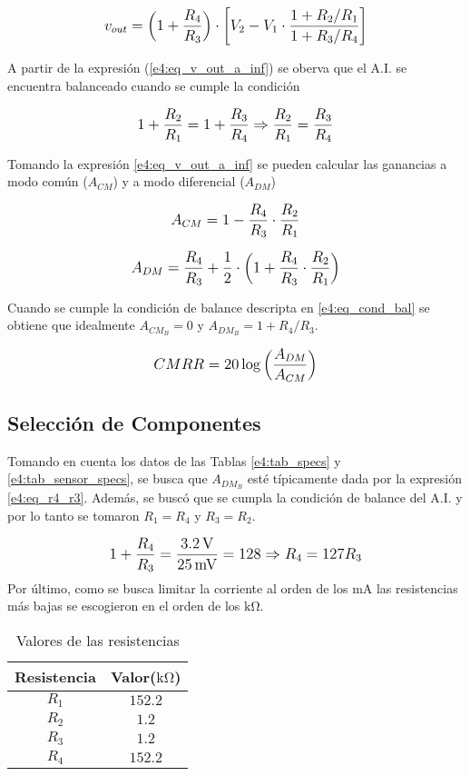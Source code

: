 \begin{equation}
\mathlarger{
v_{out} = \left(1 + \frac{R_4}{R_3}\right) \cdot \left[ V_2 - V_1 \cdot \frac{1+ R_2/R_1}{1+R_3/R_4} \right]
}
\label{e4:eq_v_out_a_inf}
\end{equation}

A partir de la expresión (\ref{e4:eq_v_out_a_inf}) se oberva que el A.I. se encuentra balanceado cuando se cumple la condición

\begin{equation}
\mathlarger{
1+\frac{R_2}{R_1} = 1+\frac{R_3}{R_4} \Rightarrow \frac{R_2}{R_1} = \frac{R_3}{R_4}
}
\label{e4:eq_cond_bal}
\end{equation}

Tomando la expresión \eqref{e4:eq_v_out_a_inf} se pueden calcular las ganancias a modo común ($A_{CM}$) y a modo diferencial ($A_{DM}$)

\begin{equation}
\mathlarger{
A_{CM} = 1 - \frac{R_4}{R_3} \cdot \frac{R_2}{R_1}
}
\label{e4:eq_A_cm}
\end{equation}

\begin{equation}
\mathlarger{
A_{DM} = \frac{R_4}{R_3} + \frac{1}{2} \cdot \left(1+ \frac{R_4}{R_3} \cdot \frac{R_2}{R_1}\right)
}
\label{e4:eq_A_dm}
\end{equation}

Cuando se cumple la condición de balance descripta en \eqref{e4:eq_cond_bal} se obtiene que idealmente $A_{CM_B} = 0$ y $A_{DM_B} = 1+R_4/R_3$.

\begin{equation}
\mathlarger{
CMRR=20\log\left(\frac{A_{DM}}{A_{CM}}\right)
}
\end{equation}

\subsection{Selección de Componentes}
Tomando en cuenta los datos de las Tablas \ref{e4:tab_specs} y \ref{e4:tab_sensor_specs}, se busca que $A_{DM_B}$ esté típicamente dada por la expresión \eqref{e4:eq_r4_r3}. Además, se buscó que se cumpla la condición de balance del A.I. y por lo tanto se tomaron $R_1=R_4$ y $R_3 = R_2$.

\begin{equation}
\mathlarger{
1+ \frac{R_4}{R_3}=\frac{\SI{3.2}{\volt}}{\SI{25}{\milli\volt}}= 128 \Rightarrow R_4=127 R_3
}
\label{e4:eq_r4_r3}
\end{equation}
 Por último, como se busca limitar la corriente al orden de los $\si{\milli\ampere}$ las resistencias más bajas se escogieron en el orden de los $\si{\kilo\ohm}$.
 
\begin{table}[ht]
\begin{center}
\begin{tabular}{||c|c||}
\hline
Resistencia	&	Valor($\si{\kilo\ohm}$) \\
\hline	
$R_1$	&	$152.2$	\\
$R_2$	&	$1.2$		\\
$R_3$	&	$1.2$		\\
$R_4$	&	$152.2$	\\
\hline
\end{tabular}
\end{center}
\caption{Valores de las resistencias}
\end{table}